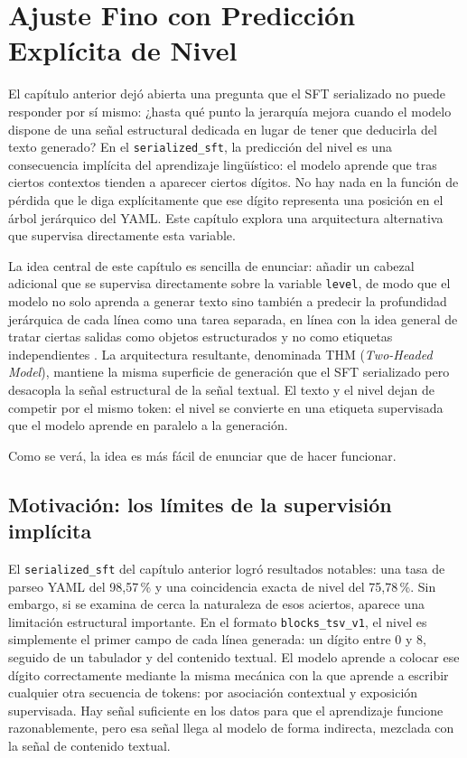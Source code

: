 %
\chapter{Ajuste Fino con Predicción Explícita de Nivel}
\label{ch::chapter6}

El capítulo anterior dejó abierta una pregunta que el SFT serializado no puede responder por sí mismo:
¿hasta qué punto la jerarquía mejora cuando el modelo dispone de una señal estructural dedicada en lugar de tener que deducirla del texto generado? En el \texttt{serialized\_sft},
la predicción del nivel es una consecuencia implícita del aprendizaje lingüístico: el modelo aprende que tras ciertos contextos tienden a aparecer ciertos dígitos. No hay nada en la
función de pérdida que le diga explícitamente que ese dígito representa una posición en el árbol jerárquico del YAML. Este capítulo explora una arquitectura alternativa que
supervisa directamente esta variable.

La idea central de este capítulo es sencilla de enunciar: añadir un cabezal adicional que se supervisa directamente sobre la variable \texttt{level}, de modo que el modelo no solo
aprenda a generar texto sino también a predecir la profundidad jerárquica de cada línea como una tarea separada, en línea con la idea general de tratar ciertas salidas como objetos estructurados y no como etiquetas independientes \citep{joachims2009structured, belanger2017spen}. La arquitectura resultante, denominada THM (\textit{Two-Headed Model}),
mantiene la misma superficie de generación que el SFT serializado pero desacopla la señal estructural de la señal textual. El texto y el nivel dejan de competir por el mismo token:
el nivel se convierte en una etiqueta supervisada que el modelo aprende en paralelo a la generación.

Como se verá, la idea es más fácil de enunciar que de hacer funcionar.


\section{Motivación: los límites de la supervisión implícita}
\label{sec:ch6_motivation}

El \texttt{serialized\_sft} del capítulo anterior logró resultados notables: una tasa de parseo YAML del 98,57\,\% y una coincidencia exacta de nivel del 75,78\,\%. Sin embargo, si
se examina de cerca la naturaleza de esos aciertos, aparece una limitación estructural importante. En el formato \texttt{blocks\_tsv\_v1}, el nivel es simplemente el primer campo de
cada línea generada: un dígito entre 0 y 8, seguido de un tabulador y del contenido textual. El modelo aprende a colocar ese dígito correctamente mediante la misma mecánica con la
que aprende a escribir cualquier otra secuencia de tokens: por asociación contextual y exposición supervisada. Hay señal suficiente en los datos para que el aprendizaje funcione
razonablemente, pero esa señal llega al modelo de forma indirecta, mezclada con la señal de contenido textual.

